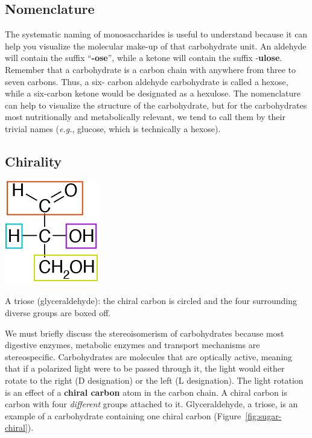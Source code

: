 \documentclass{tufte-handout}
\begin{document}
\subsection{Nomenclature}

The systematic naming of monosaccharides is useful to understand because it can help you visualize the molecular make-up of that carbohydrate unit. An aldehyde will contain the suffix ``\textbf{-ose}'', while a ketone will contain the suffix -\textbf{ulose}. Remember that a carbohydrate is a carbon chain with anywhere from three to seven carbons. Thus, a six- carbon aldehyde carbohydrate is called a hexose, while a six-carbon ketone would be designated as a hexulose. The nomenclature can help to visualize the structure of the carbohydrate, but for the carbohydrates most nutritionally and metabolically relevant, we tend to call them by their trivial names (\textit{e.g.}, glucose, which is technically a hexose).

\subsection{Chirality}

\begin{marginfigure}
\includegraphics{figures/sugar-chiral.png}
\caption{A triose (glyceraldehyde): the chiral carbon is circled and the four surrounding diverse groups are boxed off.}\label{fig:sugar-chiral}
\end{marginfigure}

We must briefly discuss the stereoisomerism of carbohydrates because most digestive enzymes, metabolic enzymes and transport mechanisms are stereospecific. Carbohydrates are molecules that are optically active, meaning that if a polarized light were to be passed through it, the
light would either rotate to the right (D designation) or the left (L designation). The light rotation is an effect of a \textbf{chiral
carbon} atom in the carbon chain. A chiral carbon is carbon with four \emph{different} groups attached to it.  Glyceraldehyde, a triose, is an example of a carbohydrate containing one chiral carbon (Figure~\ref{fig:sugar-chiral}).
\end{document}
